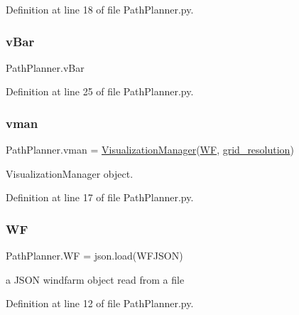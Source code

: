 Definition at line 18 of file Path\+Planner.\+py.

\mbox{\label{namespace_path_planner_a27f9a6b6d62bc8155e8fe2c5d247759f}} 
\subsubsection{\texorpdfstring{v\+Bar}{vBar}}
{\footnotesize\ttfamily Path\+Planner.\+v\+Bar}



Definition at line 25 of file Path\+Planner.\+py.

\mbox{\label{namespace_path_planner_aeb46822ede819d38fe65ab788c4db880}} 
\subsubsection{\texorpdfstring{vman}{vman}}
{\footnotesize\ttfamily Path\+Planner.\+vman = \mbox{\hyperlink{classvisualization__manager___d_j_1_1_visualization_manager}{Visualization\+Manager}}(\mbox{\hyperlink{namespace_path_planner_a9c78b28f5fddaac500a5e4db2b78279e}{WF}}, \mbox{\hyperlink{namespace_path_planner_a528f4f5acdf39deff5b1d647a2a9c516}{grid\+\_\+resolution}})}



Visualization\+Manager object. 



Definition at line 17 of file Path\+Planner.\+py.

\mbox{\label{namespace_path_planner_a9c78b28f5fddaac500a5e4db2b78279e}} 
\subsubsection{\texorpdfstring{WF}{WF}}
{\footnotesize\ttfamily Path\+Planner.\+WF = json.\+load(W\+F\+J\+S\+ON)}



a J\+S\+ON windfarm object read from a file 



Definition at line 12 of file Path\+Planner.\+py.

